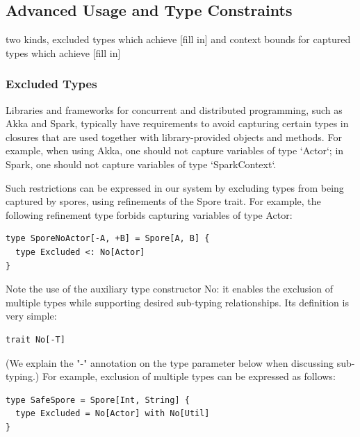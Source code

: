 \documentclass{llncs}
\begin{document}


\vspace{2mm}
\subsection{Advanced Usage and Type Constraints}
\label{sec:adv-usage-type-constraints}
\vspace{1mm}

two kinds, excluded types which achieve [fill in] and context bounds for captured types which achieve [fill in]

\subsubsection{Excluded Types}
\label{sec:excluded-types}

Libraries and frameworks for concurrent and distributed programming, such as Akka and Spark, typically have requirements to avoid capturing certain types in closures that are used together with library-provided objects and methods. For example, when using Akka, one should not capture variables of type `Actor`; in Spark, one should not capture variables of type `SparkContext`.

Such restrictions can be expressed in our system by excluding types from being captured by spores, using refinements of the Spore trait. For example, the following refinement type forbids capturing variables of type Actor:

\begin{lstlisting}
type SporeNoActor[-A, +B] = Spore[A, B] {
  type Excluded <: No[Actor]
}
\end{lstlisting}
\noindent
Note the use of the auxiliary type constructor No: it enables the exclusion of multiple types while supporting desired sub-typing relationships. Its definition is very simple:

\begin{lstlisting}
trait No[-T]
\end{lstlisting}
\noindent
(We explain the "-" annotation on the type parameter below when discussing sub-typing.) For example, exclusion of multiple types can be expressed as follows:

\begin{lstlisting}
type SafeSpore = Spore[Int, String] {
  type Excluded = No[Actor] with No[Util]
}
\end{lstlisting}
\end{document}
